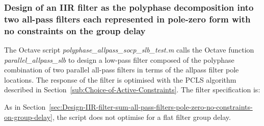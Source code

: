 \documentclass[a4paper,twoside,10pt,english]{report}
\begin{document}
\subsubsection{Design of an IIR filter as the polyphase decomposition into two all-pass filters each represented in pole-zero form with no constraints on the group delay}
The Octave script \emph{polyphase\_allpass\_socp\_slb\_test.m} calls the Octave
function \emph{parallel\_allpass\_slb}
to design a low-pass filter composed of the polyphase combination of two parallel
all-pass filters in terms of the allpass filter 
pole locations. The response of the filter is optimised with the PCLS algorithm
described in Section~\ref{sub:Choice-of-Active-Constraints}. The filter
specification is:
\begin{small}

\end{small}
As in Section~\ref{sec:Design-IIR-filter-sum-all-pass-filters-pole-zero-no-constraints-on-group-delay}, the script does not optimise for a flat filter group 
delay.
\end{document}
